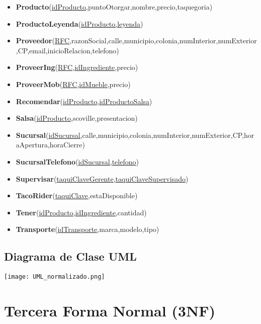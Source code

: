 \documentclass[11pt,letterpaper]{article}
\begin{document}
\begin{itemize}
\item \footnotesize{\textbf{Producto}(\underline{idProducto},puntoOtorgar,nombre,precio,taquegoria)}
\item \footnotesize{\textbf{ProductoLeyenda}(\underline{idProducto,leyenda})}
\item \scriptsize{\textbf{Proveedor}(\underline{RFC},razonSocial,calle,municipio,colonia,numInterior,numExterior,CP,email,inicioRelacion,telefono)}
\item \footnotesize{\textbf{ProveerIng}(\underline{RFC},\underline{idIngrediente},precio)}
\item \footnotesize{\textbf{ProveerMob}(\underline{RFC},\underline{idMueble},precio)}
\item \footnotesize{\textbf{Recomendar}(\underline{idProducto},\underline{idProductoSalsa})}
\item \footnotesize{\textbf{Salsa}(\underline{idProducto},scoville,presentacion)}
\item {\footnotesize \textbf{Sucursal}(\underline{idSucursal},calle,municipio,colonia,numInterior,numExterior,CP,horaApertura,horaCierre)}
\item \footnotesize{\textbf{SucursalTelefono}(\underline{idSucursal},\underline{telefono})}
\item \footnotesize{\textbf{Supervisar}(\underline{taquiClaveGerente},\underline{taquiClaveSupervisado})}
\item \footnotesize{\textbf{TacoRider}(\underline{taquiClave},estaDisponible)}
\item \footnotesize{\textbf{Tener}(\underline{idProducto},\underline{idIngrediente},cantidad)}
\item \footnotesize{\textbf{Transporte}(\underline{idTransporte},marca,modelo,tipo)}

\end{itemize}
\subsection{Diagrama de Clase UML}

 \begin{landscape}
\begin{center}
\begin{minipage}{1\linewidth}
\texttt{[image: UML\_normalizado.png]}
\end{minipage}
\end{center}
\end{landscape}
\section{Tercera Forma Normal (3NF)}
\end{document}
